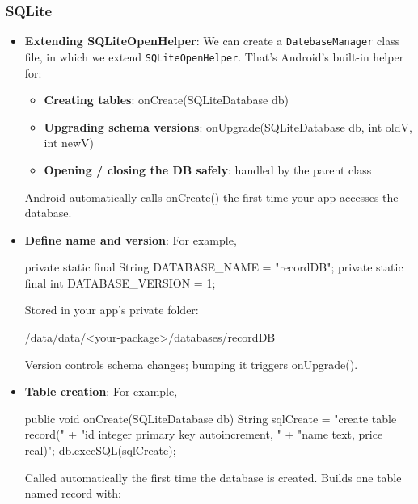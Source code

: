 \documentclass{report}
\begin{document}
    \pagebreak 
    \subsubsection{SQLite}
    \begin{itemize}
        \item \textbf{Extending SQLiteOpenHelper}: We can create a \texttt{DatebaseManager} class file, in which we extend \texttt{SQLiteOpenHelper}. That’s Android’s built-in helper for:
            \begin{itemize}
                \item \textbf{Creating tables}:	onCreate(SQLiteDatabase db)
                \item \textbf{Upgrading schema versions}:	onUpgrade(SQLiteDatabase db, int oldV, int newV)
                \item \textbf{Opening / closing the DB safely}:	handled by the parent class
            \end{itemize}
            Android automatically calls onCreate() the first time your app accesses the database.
        \item \textbf{Define name and version}: For example,
            \bigbreak \noindent 
            \begin{javacode}
                private static final String DATABASE_NAME = "recordDB";
                private static final int DATABASE_VERSION = 1;
            \end{javacode}
            \bigbreak \noindent 
            Stored in your app’s private folder:
            \bigbreak \noindent 
            \begin{bashcode}
                /data/data/<your-package>/databases/recordDB
            \end{bashcode}
            \bigbreak \noindent 
            Version controls schema changes; bumping it triggers onUpgrade().
        \item \textbf{Table creation}: For example,
            \bigbreak \noindent 
            \begin{javacode}
                public void onCreate(SQLiteDatabase db) {
                    String sqlCreate = "create table record(" +
                        "id integer primary key autoincrement, " +
                        "name text, price real)";
                    db.execSQL(sqlCreate);
                }
            \end{javacode}
            \bigbreak \noindent 
            Called automatically the first time the database is created. Builds one table named record with:

\end{itemize}
\end{document}
